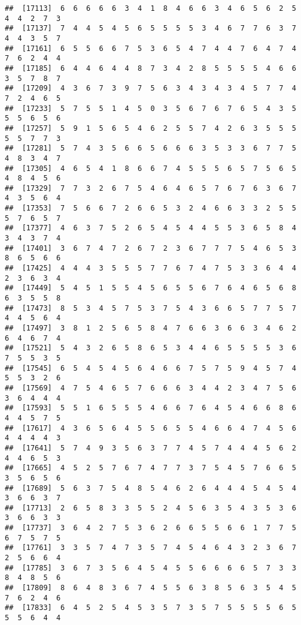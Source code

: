 \documentclass[
]{book}
\begin{document}
\begin{verbatim}
##  [17113]  6  6  6  6  6  3  4  1  8  4  6  6  3  4  6  5  6  2  5  4  4  2  7  3
##  [17137]  7  4  4  5  4  5  6  5  5  5  5  3  4  6  7  7  6  3  7  4  4  3  5  7
##  [17161]  6  5  5  6  6  7  5  3  6  5  4  7  4  4  7  6  4  7  4  7  6  2  4  4
##  [17185]  6  4  4  6  4  4  8  7  3  4  2  8  5  5  5  5  4  6  6  3  5  7  8  7
##  [17209]  4  3  6  7  3  9  7  5  6  3  4  3  4  3  4  5  7  7  4  7  2  4  6  5
##  [17233]  5  7  5  5  1  4  5  0  3  5  6  7  6  7  6  5  4  3  5  5  5  6  5  6
##  [17257]  5  9  1  5  6  5  4  6  2  5  5  7  4  2  6  3  5  5  5  5  5  7  7  3
##  [17281]  5  7  4  3  5  6  6  5  6  6  6  3  5  3  3  6  7  7  5  4  8  3  4  7
##  [17305]  4  6  5  4  1  8  6  6  7  4  5  5  5  6  5  7  5  6  5  4  8  4  5  6
##  [17329]  7  7  3  2  6  7  5  4  6  4  6  5  7  6  7  6  3  6  7  4  3  5  6  4
##  [17353]  7  5  6  6  7  2  6  6  5  3  2  4  6  6  3  3  2  5  5  5  7  6  5  7
##  [17377]  4  6  3  7  5  2  6  5  4  5  4  4  5  5  3  6  5  8  4  3  4  3  7  4
##  [17401]  3  6  7  4  7  2  6  7  2  3  6  7  7  7  5  4  6  5  3  8  6  5  6  6
##  [17425]  4  4  4  3  5  5  5  7  7  6  7  4  7  5  3  3  6  4  4  2  3  6  3  4
##  [17449]  5  4  5  1  5  5  4  5  6  5  5  6  7  6  4  6  5  6  8  6  3  5  5  8
##  [17473]  8  5  3  4  5  7  5  3  7  5  4  3  6  6  5  7  7  5  7  4  4  5  6  4
##  [17497]  3  8  1  2  5  6  5  8  4  7  6  6  3  6  6  3  4  6  2  6  4  6  7  4
##  [17521]  5  4  3  2  6  5  8  6  5  3  4  4  6  5  5  5  5  3  6  7  5  5  3  5
##  [17545]  6  5  4  5  4  5  6  4  6  6  7  5  7  5  9  4  5  7  4  5  5  3  2  6
##  [17569]  4  7  5  4  6  5  7  6  6  6  3  4  4  2  3  4  7  5  6  3  6  4  4  4
##  [17593]  5  5  1  6  5  5  5  4  6  6  7  6  4  5  4  6  6  8  6  4  4  5  7  5
##  [17617]  4  3  6  5  6  4  5  5  6  5  5  4  6  6  4  7  4  5  6  4  4  4  4  3
##  [17641]  5  7  4  9  3  5  6  3  7  7  4  5  7  4  4  4  5  6  2  4  4  6  5  3
##  [17665]  4  5  2  5  7  6  7  4  7  7  3  7  5  4  5  7  6  6  5  3  5  6  5  6
##  [17689]  5  6  3  7  5  4  8  5  4  6  2  6  4  4  4  5  4  5  4  3  6  6  3  7
##  [17713]  2  6  5  8  3  3  5  5  2  4  5  6  3  5  4  3  5  3  6  3  6  6  3  3
##  [17737]  3  6  4  2  7  5  3  6  2  6  6  5  5  6  6  1  7  7  5  6  7  5  7  5
##  [17761]  3  3  5  7  4  7  3  5  7  4  5  4  6  4  3  2  3  6  7  2  5  6  6  4
##  [17785]  3  6  7  3  5  6  4  5  4  5  5  6  6  6  6  5  7  3  3  8  4  8  5  6
##  [17809]  8  6  4  8  3  6  7  4  5  5  6  3  8  5  6  3  5  4  5  7  6  2  4  6
##  [17833]  6  4  5  2  5  4  5  3  5  7  3  5  7  5  5  5  5  6  5  5  5  6  4  4

\end{verbatim}
\end{document}
